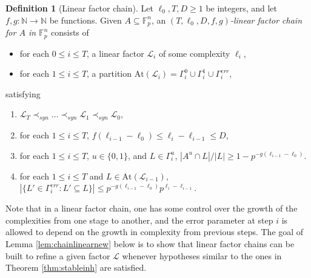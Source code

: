 \documentclass[12pt,oneside,british,a4wide]{amsart}
\numberwithin{equation}{section}
\theoremstyle{definition}
\newtheorem{definition}[theorem]{Definition}
\newcommand{\calL}{\mathcal{L}}
\newcommand{\At}{{\mathrm{At}}}
\begin{document}
\begin{definition}[Linear factor chain]\label{def:chainlin}
Let $\ell_0,T,D\geq 1$ be integers, and let $f,g:\mathbb{N}\rightarrow\mathbb{N}$ be functions.  Given $A\subseteq \mathbb{F}_p^n$, an \emph{$(T,\ell_0,D,f,g)$-linear factor chain for $A$ in $\mathbb{F}_p^n$} consists of 
\begin{itemize}
\item for each $0\leq i\leq T$, a linear factor $\calL_i$ of some complexity $\ell_i$,
\item for each $1\leq i\leq T$, a partition $\At(\calL_i)=\Gamma_i^0\cup \Gamma_i^1\cup \Gamma^{err}_i$,
\end{itemize}
satisfying
\begin{enumerate}[label=\normalfont(\arabic*)]
\item $\calL_T\prec_{syn}\ldots \prec_{syn}\calL_1\prec_{syn}\calL_0$,
\item for each $1\leq i\leq T$, $f(\ell_{i-1}-\ell_0) \leq \ell_i-\ell_{i-1} \leq D$,
\item  for each $1\leq i\leq T$, $u\in \{0,1\}$, and $L\in \Gamma_i^u$, $|A^u\cap L|/|L|\geq 1- p^{-g(\ell_{i-1}-\ell_0)}$.
\item for each $1\leq i\leq T$ and $L\in \At(\calL_{i-1})$, $|\{L'\in \Gamma^{err}_i: L'\subseteq L\}|\leq   p^{-g(\ell_{i-1}-\ell_0)}p^{\ell_i-\ell_{i-1}}$.
\end{enumerate}
\end{definition}



Note that in a linear factor chain, one has some control over the growth of the complexities from one stage to another, and the error parameter at step $i$ is allowed to depend on the growth in complexity from previous steps.   The goal of Lemma \ref{lem:chainlinearnew} below is to show that linear factor chains can be built to refine a given factor $\calL$ whenever hypotheses similar to the ones in Theorem \ref{thm:stableinh} are satisfied. 
\end{document}
